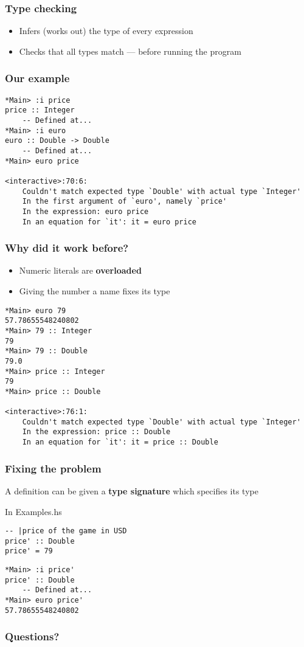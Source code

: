 \documentclass{beamer}
\begin{document}
\begin{frame}
  \frametitle{Type checking}
  \begin{itemize}
  \item  Infers (works out) the type of every expression 
  \item  Checks that all types match --- before running the program
  \end{itemize}
\end{frame}
\begin{frame}[fragile]
  \frametitle{Our example}
\begin{verbatim}
*Main> :i price
price :: Integer
  	-- Defined at...
*Main> :i euro
euro :: Double -> Double
  	-- Defined at...
*Main> euro price

<interactive>:70:6:
    Couldn't match expected type `Double' with actual type `Integer'
    In the first argument of `euro', namely `price'
    In the expression: euro price
    In an equation for `it': it = euro price
\end{verbatim}
\end{frame}
\begin{frame}[fragile]
  \frametitle{Why did it work before?}
  \begin{itemize}
  \item Numeric literals are \textbf{overloaded}
  \item  Giving the number a name fixes its type
  \end{itemize}
\begin{verbatim}
*Main> euro 79
57.78655548240802
*Main> 79 :: Integer
79
*Main> 79 :: Double
79.0
*Main> price :: Integer
79
*Main> price :: Double

<interactive>:76:1:
    Couldn't match expected type `Double' with actual type `Integer'
    In the expression: price :: Double
    In an equation for `it': it = price :: Double
\end{verbatim}
\end{frame}
\begin{frame}[fragile]
  \frametitle{Fixing the problem}
  A definition can be given a \textbf{type signature} which specifies
  its type
\begin{block}{In Examples.hs}
\begin{verbatim}
-- |price of the game in USD
price' :: Double
price' = 79
\end{verbatim}
  \end{block}
\begin{verbatim}
*Main> :i price'
price' :: Double
  	-- Defined at...
*Main> euro price'
57.78655548240802
\end{verbatim}
\end{frame}


\begin{frame}
  \frametitle{Questions?}
  \begin{center}
  \end{center}
\end{frame}
\end{document}
